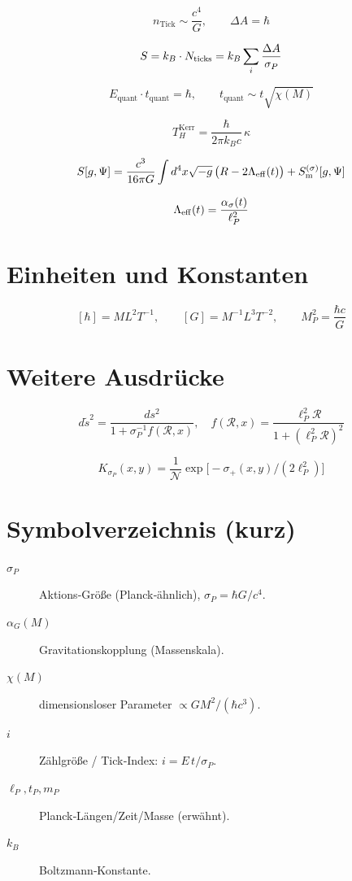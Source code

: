 \documentclass[11pt,a4paper]{article}
\begin{document}
\begin{equation}
n_{\text{Tick}} \sim \frac{c^4}{G},\qquad \Delta A = \hbar
\end{equation}

\begin{equation}
S = k_B \cdot N_{\rm ticks} = k_B \sum_i \frac{\Delta A}{\sigma_P}
\end{equation}

\begin{equation}
E_{\text{quant}}\cdot t_{\text{quant}} = \hbar,\qquad t_{\text{quant}}\sim t\sqrt{\chi(M)}
\end{equation}

\begin{equation}
T_H^{\text{Kerr}} = \frac{\hbar}{2\pi k_B c}\,\kappa
\end{equation}

\begin{equation}
S[g,\Psi] = \frac{c^3}{16\pi G}\int d^4x\sqrt{-g}\,\big(R - 2\Lambda_{\rm eff}(t)\big) + S_{\rm m}^{(\sigma)}[g,\Psi]
\end{equation}

\begin{equation}
\Lambda_{\rm eff}(t) = \frac{\alpha_\sigma(t)}{\ell_P^2}
\end{equation}

\section{Einheiten und Konstanten}
\[
[\hbar] = M L^2 T^{-1},\qquad [G]=M^{-1}L^3T^{-2},\qquad M_P^2=\frac{\hbar c}{G}
\]

\section{Weitere Ausdrücke}
\begin{equation}
d\tilde s^2 = \frac{ds^2}{1+\sigma_P^{-1}f(\mathcal R,x)},\quad f(\mathcal R,x)=\frac{\ell_P^2\mathcal R}{1+(\ell_P^2\mathcal R)^2}
\end{equation}

\begin{equation}
K_{\sigma_P}(x,y) = \frac{1}{\mathcal N}\exp\Big[-\sigma_+(x,y)/(2\ell_P^2)\Big]
\end{equation}

\section*{Symbolverzeichnis (kurz)}
\begin{description}
  \item[$\sigma_P$] Aktions‑Größe (Planck‑ähnlich), $\sigma_P=\hbar G/c^4$.
  \item[$\alpha_G(M)$] Gravitationskopplung (Massenskala).
  \item[$\chi(M)$] dimensionsloser Parameter $\propto GM^2/(\hbar c^3)$.
  \item[$i$] Zählgröße / Tick‑Index: $i=E\,t/\sigma_P$.
  \item[$\ell_P,t_P,m_P$] Planck‑Längen/Zeit/Masse (erwähnt).
  \item[$k_B$] Boltzmann‑Konstante.
\end{description}
\end{document}
